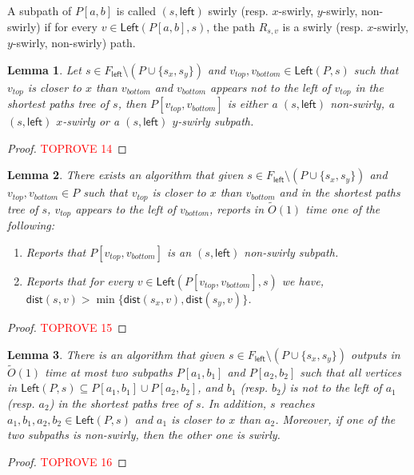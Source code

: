 \documentclass{article}
\newcommand{\Left}{\mathsf{Left}}
\newcommand{\leftside}{\mathsf{left}}
\newcommand{\dist}{\mathsf{dist}}
\newtheorem{lemma}{Lemma}
\newcommand{\Otild}{\tilde{O}}
\begin{document}
A subpath of $P[a,b]$ is called $(s,\leftside)$ swirly (resp. $x$-swirly, $y$-swirly, non-swirly) if for every $v\in \Left(P[a,b],s)$, the path $R_{s,v}$ is a swirly (resp. $x$-swirly, $y$-swirly, non-swirly) path.

\begin{lemma}\label{lem:top-bottom-swirl-together}
    Let $s\in F_{\leftside}\setminus (P\cup \{s_x,s_y\})$ and $v_{top},v_{bottom}\in \Left(P,s)$ such that $v_{top}$ is closer to $x$ than $v_{bottom}$ and  $v_{bottom}$ appears not to the left of $v_{top}$ in the shortest paths tree of $s$, then   $P[v_{top},v_{bottom}]$  is either a $(s,\leftside)$ non-swirly, a $(s,\leftside)$ $x$-swirly or a $(s,\leftside)$ $y$-swirly subpath.

\end{lemma}
\begin{proof}\textcolor{red}{TOPROVE 14}\end{proof}


\begin{lemma}\label{lem:classifyinterval}
    There exists an algorithm that given $s\in F_{\leftside}\setminus (P\cup\{s_x,s_y\})$ and $v_{top},v_{bottom}\in P$ such that $v_{top}$ is closer to $x$ than $v_{bottom}$ and in the shortest paths tree of $s$, $v_{top}$ appears to the left of $v_{bottom}$, reports in $\Otild(1)$ time one of the following:
    \begin{enumerate}
        \item Reports that $P[v_{top},v_{bottom}]$ is an $(s,\leftside)$ non-swirly subpath.
        \item Reports that for every $v\in \Left(P[v_{top},v_{bottom}],s)$ we have, $\dist(s,v)>\min\{\dist(s_x,v),\dist(s_y,v)\}$.
    \end{enumerate}
\end{lemma}
\begin{proof}\textcolor{red}{TOPROVE 15}\end{proof}


\begin{lemma}\label{lem:TopTreeBotTree-Partition}
There is an algorithm that given $s\in F_{\leftside} \setminus (P\cup\{s_x,s_y\})$ outputs in $\Otild(1)$ time at most two subpaths $P[a_1,b_1]$ and $P[a_2,b_2]$ such that all vertices in $\Left(P,s)\subseteq P[a_1,b_1] \cup P[a_2,b_2]$, and $b_1$ (resp. $b_2$) is not to the left of $a_1$ (resp. $a_2$) in the shortest paths tree of $s$.
In addition, $s$ reaches $a_1,b_1,a_2,b_2\in \Left(P,s)$ and $a_1$ is closer to $x$ than $a_2$.
Moreover, if one of the two subpaths is non-swirly, then the other one is swirly.
\end{lemma}
\begin{proof}\textcolor{red}{TOPROVE 16}\end{proof}
\end{document}
